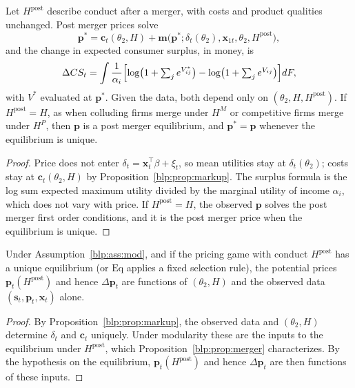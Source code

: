 \begin{proposition}\label{blp:prop:merger}
Let $H^{\mathrm{post}}$ describe conduct after a merger, with costs and product qualities
unchanged. Post merger prices solve
\[
\bm p^\ast = \bm c_t(\theta_2,H) + \bm m\bigl(\bm p^\ast;\delta_t(\theta_2),\bm x_{1t},\theta_2,H^{\mathrm{post}}\bigr),
\]
and the change in expected consumer surplus, in money, is
\[
\Delta CS_t = \int \frac{1}{\alpha_i}\Bigl[\log\bigl(1+\textstyle\sum_j e^{V^\ast_{ij}}\bigr) - \log\bigl(1+\sum_j e^{V_{ij}}\bigr)\Bigr]dF ,
\]
with $V^\ast$ evaluated at $\bm p^\ast$. Given the data, both depend only on
$(\theta_2,H,H^{\mathrm{post}})$. If $H^{\mathrm{post}} = H$, as when colluding firms merge under
$H^M$ or competitive firms merge under $H^P$, then $\bm p$ is a post merger equilibrium, and
$\bm p^\ast = \bm p$ whenever the equilibrium is unique.
\end{proposition}
\begin{proof}
Price does not enter $\delta_t = \bm x_t^\top\beta + \xi_t$, so mean utilities stay at
$\delta_t(\theta_2)$; costs stay at $\bm c_t(\theta_2,H)$ by Proposition~\ref{blp:prop:markup}. The
surplus formula is the log sum expected maximum utility divided by the marginal utility of income
$\alpha_i$, which does not vary with price. If $H^{\mathrm{post}}=H$, the observed $\bm p$ solves
the post merger first order conditions, and it is the post merger price when the equilibrium is
unique.
\end{proof}

\begin{proposition}\label{blp:prop:ident}
Under Assumption~\ref{blp:ass:mod}, and if the pricing game with conduct $H^{\mathrm{post}}$ has a unique equilibrium (or $\mathrm{Eq}$ applies a fixed selection rule), the potential prices $\bm p_t(H^{\mathrm{post}})$ and hence
$\Delta\bm p_t$ are functions of $(\theta_2,H)$ and the observed data $(\bm s_t,\bm p_t,\bm x_t)$ alone.
\end{proposition}
\begin{proof}
By Proposition~\ref{blp:prop:markup}, the observed data and $(\theta_2,H)$ determine
$\delta_t$ and $\bm c_t$ uniquely. Under modularity these are the inputs to the equilibrium under
$H^{\mathrm{post}}$, which Proposition~\ref{blp:prop:merger} characterizes. By the hypothesis on the equilibrium, $\bm p_t(H^{\mathrm{post}})$ and hence $\Delta\bm p_t$ are then functions of these inputs.
\end{proof}

